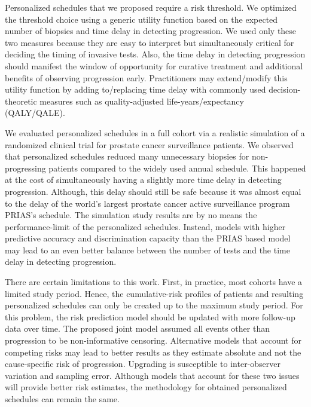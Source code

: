 \documentclass[useAMS, usenatbib, referee]{biom}
\begin{document}
Personalized schedules that we proposed require a risk threshold. We optimized the threshold choice using a generic utility function based on the expected number of biopsies and time delay in detecting progression. We used only these two measures because they are easy to interpret but simultaneously critical for deciding the timing of invasive tests. Also, the time delay in detecting progression should manifest the window of opportunity for curative treatment and additional benefits of observing progression early. Practitioners may extend/modify this utility function by adding to/replacing time delay with commonly used decision-theoretic measures such as quality-adjusted life-years/expectancy (QALY/QALE).

We evaluated personalized schedules in a full cohort via a realistic simulation of a randomized clinical trial for prostate cancer surveillance patients. We observed that personalized schedules reduced many unnecessary biopsies for non-progressing patients compared to the widely used annual schedule. This happened at the cost of simultaneously having a slightly more time delay in detecting progression. Although, this delay should still be safe because it was almost equal to the delay of the world's largest prostate cancer active surveillance program PRIAS's schedule. The simulation study results are by no means the performance-limit of the personalized schedules. Instead, models with higher predictive accuracy and discrimination capacity than the PRIAS based model may lead to an even better balance between the number of tests and the time delay in detecting progression.

There are certain limitations to this work. First, in practice, most cohorts have a limited study period. Hence, the cumulative-risk profiles of patients and resulting personalized schedules can only be created up to the maximum study period. For this problem, the risk prediction model should be updated with more follow-up data over time. The proposed joint model assumed all events other than progression to be non-informative censoring. Alternative models that account for competing risks may lead to better results as they estimate absolute and not the cause-specific risk of progression. Upgrading is susceptible to inter-observer variation and sampling error. Although models that account for these two issues~\citep{balasubramanian2003estimation,coley2017prediction} will provide better risk estimates, the methodology for obtained personalized schedules can remain the same.
\end{document}
